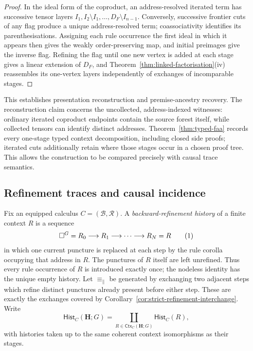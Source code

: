 \documentclass[10pt,a4paper]{article}
\theoremstyle{plain}
\theoremstyle{definition}
\theoremstyle{remark}
\newcommand{\Base}{\mathcal B}
\newcommand{\Rules}{\mathcal R}
\newcommand{\Ctx}{\mathsf{Ctx}}
\newcommand{\eqtag}{\refstepcounter{equation}\tag{\theequation}}
\begin{document}
\begin{proof}
In the ideal form of the coproduct, an address-resolved iterated term has
successive tensor layers
\(I_1,I_2\setminus I_1,\ldots,D_F\setminus I_{n-1}\).
Conversely, successive frontier cuts of any flag produce a unique
address-resolved term; coassociativity identifies its parenthesisations.
Assigning each rule occurrence the first ideal in which it appears then
gives the weakly order-preserving map, and initial preimages give the
inverse flag.  Refining the flag until one new vertex is added at each
stage gives a linear extension of \(D_F\), and
Theorem~\ref{thm:linked-factorisation}(iv) reassembles its
one-vertex layers independently of exchanges of incomparable stages.
\end{proof}

This establishes presentation reconstruction and premise-ancestry
recovery.  The reconstruction claim concerns the uncollected,
address-indexed witnesses: ordinary iterated coproduct endpoints contain
the source forest itself, while collected tensors can identify distinct
addresses.  Theorem~\ref{thm:typed-faa} records every one-stage typed
context decomposition, including closed side proofs; iterated cuts
additionally retain where those stages occur in a chosen proof tree.  This
allows the construction to be compared precisely with causal trace
semantics.

\subsection{Refinement traces and causal incidence}

Fix an equipped calculus \(C=(\Base,\Rules)\).  A \emph{backward-refinement
history} of a finite context \(R\) is a sequence
\[
 \Box^G=R_0\longrightarrow R_1\longrightarrow\cdots
       \longrightarrow R_N=R
\eqtag\label{eq:refinement-history}
\]
in which one current puncture is replaced at each step by the rule corolla
occupying that address in \(R\).  The punctures of \(R\) itself are left
unrefined.  Thus every rule occurrence of \(R\) is introduced exactly once;
the nodeless identity has the unique empty history.  Let
\(\equiv_{\parallel}\) be generated by exchanging two adjacent steps which
refine distinct punctures already present before either step.  These are
exactly the exchanges covered by
Corollary~\ref{cor:strict-refinement-interchange}.
Write
\[
 \mathsf{Hist}_C(\mathbf H;G)
   =\coprod_{R\in\Ctx_C(\mathbf H;G)}\mathsf{Hist}_C(R),
\]
with histories taken up to the same coherent context isomorphisms as their
stages.
\end{document}
